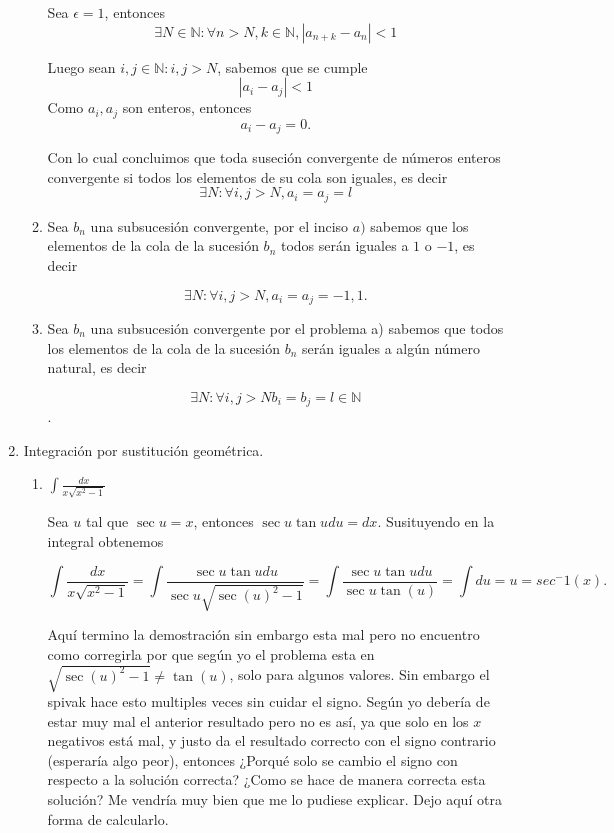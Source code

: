 \documentclass[letterpaper]{article}
\theoremstyle{definition}
\theoremstyle{lemathm}
\theoremstyle{lemademthm}
\begin{document}
\begin{enumerate}
\begin{enumerate}
            Sea $\epsilon = 1$, entonces
            \[\exists N \in \mathbb{N} : \forall n > N, k \in \mathbb{N}, |a_{n+k} - a_{n}| < 1\]
            
            Luego sean $i,j \in \mathbb{N} : i,j > N$, sabemos que se cumple
            \[|a_i - a_j| < 1\]
            Como $a_i, a_j$ son enteros, entonces
            \[a_i - a_j = 0.\]
            
            Con lo cual concluimos que toda suseción convergente de números enteros convergente si todos los elementos de su cola son iguales, es decir
            \[\exists N : \forall i,j > N, a_i = a_j = l\]
            
            \item Sea $b_n$ una subsucesión convergente, por el inciso $a)$ sabemos que los elementos de la cola de la sucesión $b_n$ todos serán iguales a $1$ o $-1$, es decir

            \[\exists N : \forall i,j > N, a_i = a_j = {-1,1}.\]

            \item Sea $b_n$ una subsucesión convergente por el problema a) sabemos que todos los elementos de la cola de la sucesión $b_n$ serán iguales a algún número natural, es decir
            
            \[\exists N : \forall i,j > N b_i = b_j = l \in \mathbb{N}\].
            
        \end{enumerate}
    
        \item Integración por sustitución geométrica.
        
        \begin{enumerate}
            \item $\int \frac{dx}{x\sqrt{x^2-1}}$
			
			Sea $u$ tal que $\sec u = x$, entonces $\sec u \tan u du = dx$. Susituyendo en la integral obtenemos

			\[\int \frac{dx}{x\sqrt{x^2-1}} = \int \frac{\sec u \tan u du}{\sec u\sqrt{\sec(u)^2-1}} = \int \frac{\sec u \tan u du}{\sec u\tan(u)} = \int du = u = sec^-1(x).\]

			Aquí termino la demostración sin embargo esta mal pero no encuentro como corregirla por que según yo el problema esta en $\sqrt{\sec(u)^2-1} \neq \tan(u)$, solo para algunos valores. Sin embargo el spivak hace esto multiples veces sin cuidar el signo. Según yo debería de estar muy mal el anterior resultado pero no es así, ya que solo en los $x$ negativos está mal, y justo da el resultado correcto con el signo contrario (esperaría algo peor), entonces ¿Porqué solo se cambio el signo con respecto a la solución correcta? ¿Como se hace de manera correcta esta solución? Me vendría muy bien que me lo pudiese explicar. Dejo aquí otra forma de calcularlo.


\end{enumerate}
\end{enumerate}
\end{document}
